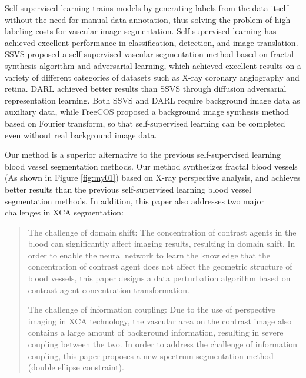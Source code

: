 Self-supervised learning trains models by generating labels from the data itself without the need for manual data annotation, thus solving the problem of high labeling costs for vascular image segmentation. Self-supervised learning has achieved excellent performance in classification\cite{FC.26}\cite{FC.4}, detection\cite{FC.42}\cite{FC.5}, and image translation\cite{FC.29}\cite{FC.41}. SSVS\cite{01.02.SSVS} proposed a self-supervised vascular segmentation method based on fractal synthesis algorithm and adversarial learning, which achieved excellent results on a variety of different categories of datasets such as X-ray coronary angiography and retina. DARL\cite{01.01.DARL} achieved better results than SSVS through diffusion adversarial representation learning. Both SSVS and DARL require background image data as auxiliary data, while FreeCOS\cite{02.01.FreeCOS} proposed a background image synthesis method based on Fourier transform, so that self-supervised learning can be completed even without real background image data.

Our method is a superior alternative to the previous self-supervised learning blood vessel segmentation methods. 
Our method synthesizes fractal blood vessels (As shown in Figure \cref{fig:my01}) based on X-ray perspective analysis, 
and achieves better results than the previous self-supervised learning blood vessel segmentation methods. 
In addition, this paper also addresses two major challenges in XCA segmentation:
\begin{quotation}
  \noindent
The challenge of domain shift: The concentration of contrast agents in the blood can significantly affect imaging results, resulting in domain shift. In order to enable the neural network to learn the knowledge that the concentration of contrast agent does not affect the geometric structure of blood vessels, this paper designs a data perturbation algorithm based on contrast agent concentration transformation.

The challenge of information coupling: Due to the use of perspective imaging in XCA technology, the vascular area on the contrast image also contains a large amount of background information, resulting in severe coupling between the two. In order to address the challenge of information coupling, this paper proposes a new spectrum segmentation method (double ellipse constraint).
  \end{quotation}
  

